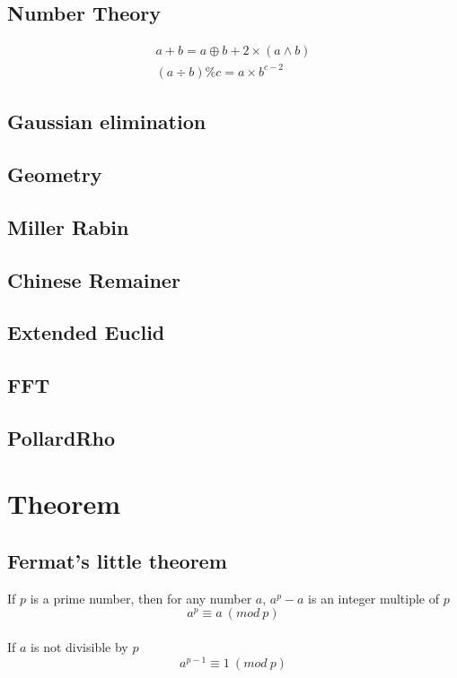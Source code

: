 \documentclass[A4 paper, 12pt, oneside]{article}
\begin{document}
\begin{landscape}
\begin{multicols}{2}
    \subsection{Number Theory}
    \begin{align*}
        a + b = a \oplus b + 2 \times (a \wedge b) \\
        (a \div b) \% c = a \times b^{c - 2}
    \end{align*}

	\subsection{Gaussian elimination}
		    

	\subsection{Geometry}
	
	
	\subsection{Miller Rabin}
	

	\subsection{Chinese Remainer}
	
	
	\subsection{Extended Euclid}
	

	\subsection{FFT}
	

	\subsection{PollardRho}
	

\section{Theorem}
	\subsection{Fermat's little theorem}
	If $p$ is a prime number, then for any number $a$, \(a^p - a\) is an integer multiple of $p$ \\
	\[a ^ p \equiv a \ (mod \ p)\]  \\
	If $a$ is not divisible by $p$ \\
	\[a ^ {p - 1} \equiv 1 \ (mod \ p)\] 
	

\end{multicols}
\end{landscape}
\end{document}
